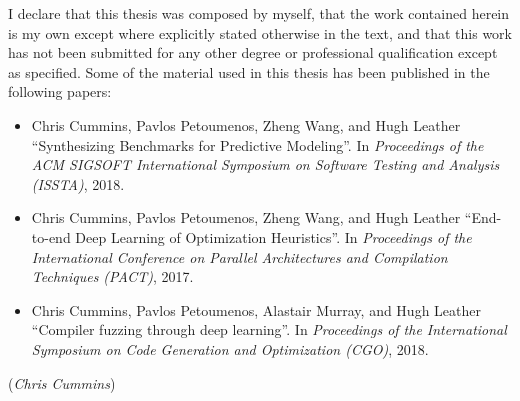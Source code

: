 \begin{preliminary}
  \maketitle

  \begin{acknowledgements}%
  \end{acknowledgements}%

	\begin{declaration}
		I declare that this thesis was composed by myself, that the work contained herein is my own except where explicitly stated otherwise in the text, and that this work has not been submitted for any other degree or professional qualification except as specified. Some of the material used in this thesis has been published in the following papers:
		\begin{itemize}
			\item Chris Cummins, Pavlos Petoumenos, Zheng Wang, and Hugh Leather ``Synthesizing Benchmarks for Predictive Modeling''. In \emph{Proceedings of the ACM SIGSOFT International Symposium on Software Testing and Analysis (ISSTA)}, 2018.
			\item Chris Cummins, Pavlos Petoumenos, Zheng Wang, and Hugh Leather ``End-to-end Deep Learning of Optimization Heuristics''. In \emph{Proceedings of the International Conference on Parallel Architectures and Compilation Techniques (PACT)}, 2017.
			\item Chris Cummins, Pavlos Petoumenos, Alastair Murray, and Hugh Leather ``Compiler fuzzing through deep learning''. In \emph{Proceedings of the International Symposium on Code Generation and Optimization (CGO)}, 2018.
		\end{itemize}
		\vspace{1in}\raggedleft({\em Chris Cummins\/})
	\end{declaration} 

  \dedication{Dedication Lorem Ipsum}

  \tableofcontents
  \listoffigures
  \listoftables
  \listofalgorithms
  \lstlistoflistings
\end{preliminary}
